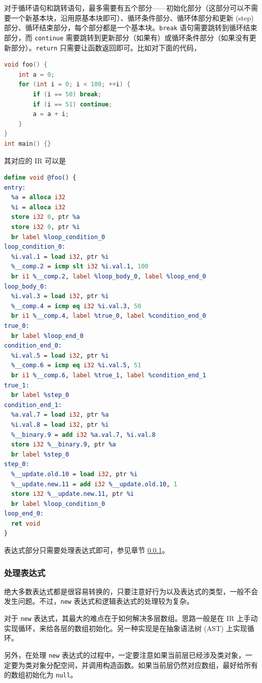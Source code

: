 对于循环语句和跳转语句，最多需要有五个部分——初始化部分（这部分可以不需要一个新基本块，沿用原基本块即可）、循环条件部分、循环体部分和更新
(step) 部分、循环结束部分，每个部分都是一个基本块。\texttt{break}
语句需要跳转到循环结束部分，而 \texttt{continue}
需要跳转到更新部分（如果有）或循环条件部分（如果没有更新部分）。\texttt{return}
只需要让函数返回即可。比如对下面的代码，
\begin{lstlisting}[language=C++]
void foo() {
    int a = 0;
    for (int i = 0; i < 100; ++i) {
        if (i == 50) break;
        if (i == 51) continue;
        a = a + i;
    }
}
int main() {}
\end{lstlisting}
其对应的 IR 可以是
\begin{lstlisting}[language=LLVM]
define void @foo() {
entry:
  %a = alloca i32
  %i = alloca i32
  store i32 0, ptr %a
  store i32 0, ptr %i
  br label %loop_condition_0
loop_condition_0:
  %i.val.1 = load i32, ptr %i
  %__comp.2 = icmp slt i32 %i.val.1, 100
  br i1 %__comp.2, label %loop_body_0, label %loop_end_0
loop_body_0:
  %i.val.3 = load i32, ptr %i
  %__comp.4 = icmp eq i32 %i.val.3, 50
  br i1 %__comp.4, label %true_0, label %condition_end_0
true_0:
  br label %loop_end_0
condition_end_0:
  %i.val.5 = load i32, ptr %i
  %__comp.6 = icmp eq i32 %i.val.5, 51
  br i1 %__comp.6, label %true_1, label %condition_end_1
true_1:
  br label %step_0
condition_end_1:
  %a.val.7 = load i32, ptr %a
  %i.val.8 = load i32, ptr %i
  %__binary.9 = add i32 %a.val.7, %i.val.8
  store i32 %__binary.9, ptr %a
  br label %step_0
step_0:
  %__update.old.10 = load i32, ptr %i
  %__update.new.11 = add i32 %__update.old.10, 1
  store i32 %__update.new.11, ptr %i
  br label %loop_condition_0
loop_end_0:
  ret void
}
\end{lstlisting}

表达式部分只需要处理表达式即可，参见章节 \ref{AST-to-IR-expression}。

\subsubsection{处理表达式}\label{AST-to-IR-expression}

绝大多数表达式都是很容易转换的，只要注意好行为以及表达式的类型，一般不会发生问题。不过，\texttt{new}
表达式和逻辑表达式的处理较为复杂。

对于 \texttt{new} 表达式，其最大的难点在于如何解决多层数组。思路一般是在 IR
上手动实现循环，来给各层的数组初始化。另一种实现是在抽象语法树 (AST)
上实现循环。

另外，在处理 \texttt{new} 表达式的过程中，一定要注意如果当前层已经涉及类对象，一定要为类对象分配空间，并调用构造函数。如果当前层仍然对应数组，最好给所有的数组初始化为
\texttt{null}。

